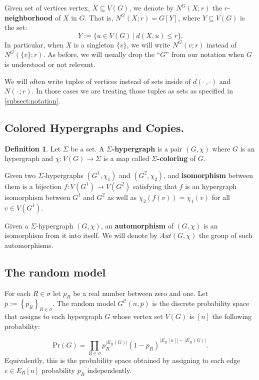 \documentclass[12pt,notitlepage,a4paper]{article}
\theoremstyle{definition}
\newtheorem{definition}{Definition}[section]
\newcommand{\InR}[1]{\left\{ #1_R \right\}_{R\in \sigma}}
\begin{document}
Given set of vertices vertex, $X\subseteq V(G)$, 
we denote by $N^G(X;r)$ the $r$-\textbf{neighborhood} of $X$ in 
$G$. That is,  $N^G(X;r)= G[Y]$, where $Y\subseteq V(G)$ is 
the set:
\[ Y:= \{ u \in V(G) \ | \ d(X,u)\leq r   \}. \]
In particular, when $X$ is a singleton $\{v\}$, we
will write $N^G(v;r)$ instead of $N^G(\{v\};r)$.
As before, we will usually drop the ``$G$'' from our 
notation when $G$ is understood or not relevant.  \par

We will often write tuples of vertices instead of sets
inside of $d(\cdot\, , \cdot)$ and $N(\cdot\, ;r)$. In those cases
we are treating those tuples as sets as specified in
\cref{subsect:notation}. 

\subsection{Colored Hypergraphs and Copies.}

\begin{definition}
	Let $\Sigma$ be a set. A \textbf{$\Sigma$-hypergraph}
	is a pair $(G, \chi)$ where $G$ is an hypergraph
	and $\chi: V(G)\rightarrow \Sigma$ is a map 
	called \textbf{$\Sigma$-coloring} of $G$. \par
	Given two $\Sigma$-hypergraphs $(G^1,\chi_1)$
	and $(G^2,\chi_2)$, and \textbf{isomorphism} between them is
	a bijection $f:V(G^1)\rightarrow V(G^2)$ satisfying
	that $f$ is an hypergraph isomorphism between $G^1$ and
	$G^2$ as well as
	$\chi_2(f(v))=\chi_1(v)$ for all $v\in V(G^1)$.\par	 
	Given a $\Sigma$-hypergraph $(G,\chi)$, an \textbf{automorphism}
	of $(G,\chi)$ is an isomorphism from it into itself. We will denote
	by $Aut(G,\chi)$ the group of such automorphisms. 
\end{definition}


\subsection{The random model}

For each $R\in \sigma$ let
$p_R$ be a real number between zero and one.
Let $\overline{p}:=\InR{p}$.
The random model $G^{\mathcal{C}}(n,\overline{p})$ 
is the discrete probability space that
assigns to each hypergraph $G$ whose vertex
set $V(G)$ is $[n]$ the following probability:

\[ \mathrm{Pr}(G)=\prod_{R\in \sigma} p_R^{|E_R(G)|}
(1-p_R)^{ \big|E_R[n]\big|-\big|E_R(G)\big|}.	
\]
Equivalently, this is the probability space obtained by 
assigning to each edge $e\in E_R[n]$ probability 
$p_R$ independently. \par
\end{document}
